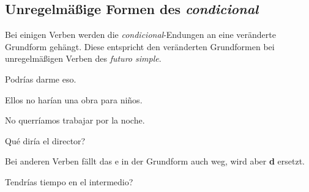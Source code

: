 \subsection*{Unregelmäßige Formen des \textit{condicional}}
Bei einigen Verben werden die \textit{condicional}-Endungen 
an eine veränderte Grundform gehängt. Diese entspricht den
veränderten Grundformen bei unregelmäßigen Verben des 
\textit{futuro simple}.
\begin{ejemplos}
    \item Podr\'ias darme eso.
    \item Ellos no har\'ian una obra para ni\~nos.
    \item No querr\'iamos trabajar por la noche.
    \item Qu\'e dir\'ia el director?
\end{ejemplos}
Bei anderen Verben fällt das e in der Grundform auch weg,
wird aber \textbf{d} ersetzt.
\begin{ejemplos}
    \item Tendr\'ias tiempo en el intermedio?
\end{ejemplos}
